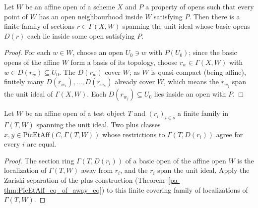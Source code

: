 \begin{theorem}
  \label{pa-thm:exists_basic_subcover}
  \leanok

  Let \(W\) be an affine open of a scheme \(X\) and \(P\) a property of opens such that every point
  of \(W\) has an open neighbourhood inside \(W\) satisfying \(P\). Then there is a finite family of
  sections \(r \in \Gamma(X, W)\) spanning the unit ideal whose basic opens \(D(r)\) each lie inside
  some open satisfying \(P\).
\end{theorem}
\begin{proof}
  \leanok
  For each \(w \in W\), choose an open \(U_0 \ni w\) with \(P(U_0)\); since the basic opens of the
  affine \(W\) form a basis of its topology, choose \(r_w \in \Gamma(X, W)\) with \(w \in D(r_w)
  \subseteq U_0\). The \(D(r_w)\) cover \(W\); as \(W\) is quasi-compact (being affine), finitely
  many \(D(r_{w_1}), \dots, D(r_{w_n})\) already cover \(W\), which means the \(r_{w_j}\) span the
  unit ideal of \(\Gamma(X, W)\). Each \(D(r_{w_j}) \subseteq U_0\) lies inside an open with \(P\).
\end{proof}

\begin{theorem}
  \label{pa-thm:picEt_eq_of_basic_eq}
  \leanok

  Let \(W\) be an affine open of a test object \(T\) and \((r_i)_{i \in s}\) a finite family in
  \(\Gamma(T, W)\) spanning the unit ideal. Two plus classes \(x, y \in \mathrm{PicEtAff}(C,
  \Gamma(T, W))\) whose restrictions to \(\Gamma(T, D(r_i))\) agree for every \(i\) are equal.
\end{theorem}
\begin{proof}
  \leanok
  The section ring \(\Gamma(T, D(r_i))\) of a basic open of the affine open \(W\) is the
  localization of \(\Gamma(T, W)\) away from \(r_i\), and the \(r_i\) span the unit ideal. Apply the
  Zariski separation of the plus construction (Theorem~\ref{pa-thm:PicEtAff_eq_of_away_eq}) to this
  finite covering family of localizations of \(\Gamma(T, W)\).
\end{proof}

